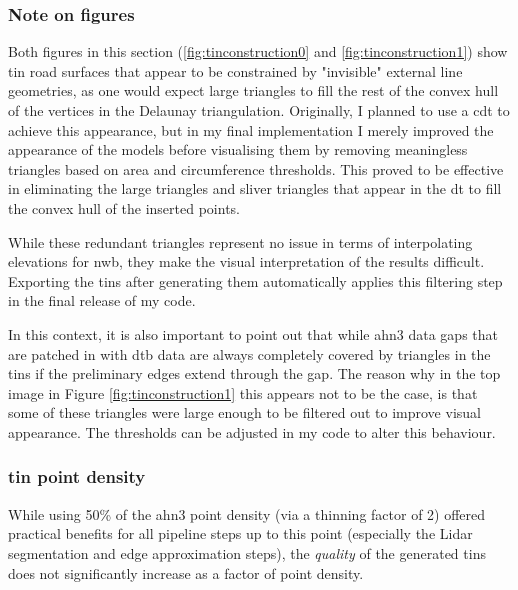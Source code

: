 \subsubsection{Note on figures}

Both figures in this section (\ref{fig:tinconstruction0} and \ref{fig:tinconstruction1}) show \ac{tin} road surfaces that appear to be constrained by "invisible" external line geometries, as one would expect large triangles to fill the rest of the convex hull of the vertices in the Delaunay triangulation. Originally, I planned to use a \ac{cdt} to achieve this appearance, but in my final implementation I merely improved the appearance of the models before visualising them by removing meaningless triangles based on area and circumference thresholds. This proved to be effective in eliminating the large triangles and sliver triangles that appear in the \ac{dt} to fill the convex hull of the inserted points.

While these redundant triangles represent no issue in terms of interpolating elevations for \ac{nwb}, they make the visual interpretation of the results difficult. Exporting the \ac{tin}s after generating them automatically applies this filtering step in the final release of my code.

In this context, it is also important to point out that while \ac{ahn3} data gaps that are patched in with \ac{dtb} data are always completely covered by triangles in the \ac{tin}s if the preliminary edges extend through the gap. The reason why in the top image in Figure \ref{fig:tinconstruction1} this appears not to be the case, is that some of these triangles were large enough to be filtered out to improve visual appearance. The thresholds can be adjusted in my code to alter this behaviour.

\subsubsection{\ac{tin} point density}

While using 50\% of the \ac{ahn3} point density (via a thinning factor of 2) offered practical benefits for all pipeline steps up to this point (especially the Lidar segmentation and edge approximation steps), the \textit{quality} of the generated \ac{tin}s does not significantly increase as a factor of point density.

